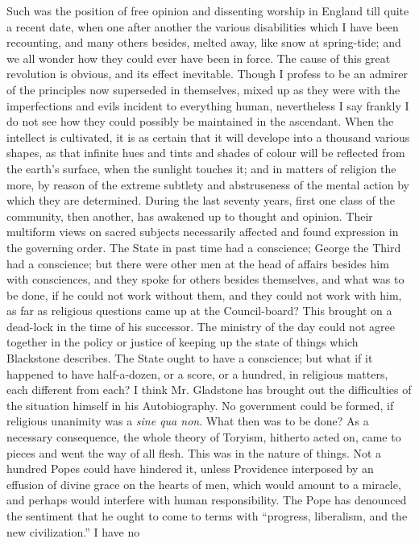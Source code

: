 Such was the position of free opinion and dissenting worship in
England till quite a recent date, when one after another the various
disabilities which I have been recounting, and many others besides,
melted away, like snow at spring-tide; and we all wonder how they could ever have been in force. The cause of this great revolution is
obvious, and its effect inevitable. Though I profess to be an admirer of
the principles now superseded in themselves, mixed up as they were with
the imperfections and evils incident to everything human, nevertheless I
say frankly I do not see how they could possibly be maintained in the
ascendant. When the intellect is cultivated, it is as certain that it
will develope into a thousand various shapes, as that infinite hues and
tints and shades of colour will be reflected from the earth's surface,
when the sunlight touches it; and in matters of religion the more, by
reason of the extreme subtlety and abstruseness of the mental action by
which they are determined. During the last seventy years, first one
class of the community, then another, has awakened up to thought and
opinion. Their multiform views on sacred subjects necessarily affected
and found expression in the governing order. The State in past time had
a conscience; George the Third had a conscience; but there were other
men at the head of affairs besides him with consciences, and they spoke
for others besides themselves, and what was to be done, if he could not
work without them, and they could not work with him, as far as religious
questions came up at the Council-board? This brought on a dead-lock in
the time of his successor. The ministry of the day could not agree
together in the policy or justice of keeping up the state of things
which Blackstone describes. The State ought to have a conscience; but
what if it happened to have half-a-dozen, or a score, or a hundred, in
religious matters, each different from each? I think Mr. Gladstone has
brought out the difficulties of the situation himself in his
Autobiography. No government could be formed, if religious unanimity was
a \emph{sine qua non}. What then was to be done? As a necessary
consequence, the whole theory of Toryism, hitherto acted on, came to
pieces and went the way of all flesh. This was in the nature of things.
Not a hundred Popes could have hindered it, unless Providence interposed
by an effusion of divine grace on the hearts of men, which would amount
to a miracle, and perhaps would interfere with human responsibility. The
Pope has denounced the sentiment that he ought to come to terms with
``progress, liberalism, and the new civilization.'' I have no
